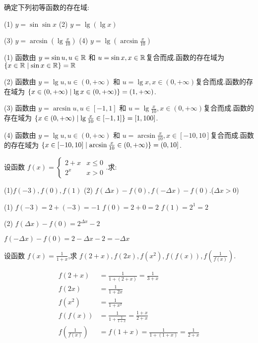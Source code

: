 \begin{practice}
    确定下列初等函数的存在域:

    (1) $y=\sin \sin x$ \qquad 
    (2) $y=\lg (\lg x)$

    (3) $y=\arcsin(\lg \frac{x}{10})$ \qquad 
    (4) $y=\lg (\arcsin \frac{x}{10})$
\end{practice}

\begin{solve}
    (1) 函数由 $y=\sin u,u\in \mathbb{R}$ 和 $u=\sin x,x\in \mathbb{R}$复合而成.函数的存在域为 $\{x\in \mathbb{R}\mid\sin x\in \mathbb{R}\}=\mathbb{R}$

    (2) 函数由 $y=\lg u,u\in (0,+\infty)$ 和 $u=\lg x,x\in (0,+\infty)$复合而成.函数的存在域为 $\{x\in (0,+\infty)\mid\lg x\in (0,+\infty)\}=(1,+\infty)$.

    (3) 函数由 $y=\arcsin u,u\in [-1,1]$ 和 $u=\lg \frac{x}{10},x\in (0,+\infty)$复合而成.函数的存在域为 $\{x\in (0,+\infty)\mid\lg \frac{x}{10}\in [-1,1]\}=[1,100]$.

    (4) 函数由 $y=\lg u,u\in (0,+\infty)$ 和 $u=\arcsin\frac{x}{10},x\in [-10,10]$复合而成.函数的存在域为 $\{x\in [-10,10]\mid\arcsin \frac{x}{10}\in (0,+\infty)\}=(0,10]$.
\end{solve}

\begin{practice}
    设函数 $f(x)=\begin{cases}
        2+x & x\le 0 \\
        2^x & x>0
    \end{cases}$.求:

    (1)$f(-3),f(0),f(1)$ \qquad (2) $f(\Delta x)-f(0),f(-\Delta x)-f(0)$.($\Delta x> 0$)
\end{practice}

\begin{solve}
    (1) $f(-3)=2+(-3)=-1$ \quad $f(0)=2+0=2$ \quad $f(1)=2^1=2$

    (2) $f(\Delta x)-f(0)=2^{\Delta x}-2$

    $f(-\Delta x)-f(0)=2-\Delta x-2=-\Delta x$
\end{solve}

\begin{practice}
    设函数 $f(x)=\frac{1}{1+x}$,求 $f(2+x),f(2x),f(x^2),f(f(x)),f(\frac{1}{f(x)})$.
\end{practice}

\begin{solve}
    \begin{align*}
        f(2+x)&= \frac{1}{1+(2+x)}=\frac{1}{3+x} \\
        f(2x)&= \frac{1}{1+2x} \\
        f(x^2)&= \frac{1}{1+x^2}\\
        f(f(x))&= \frac{1}{1+\frac{1}{1+x}}=\frac{1+x}{2+x} \\
        f(\frac{1}{f(x)})&=f(1+x)=\frac{1}{1+(1+x)}=\frac{1}{2+x}
    \end{align*}
    \quad
\end{solve}

